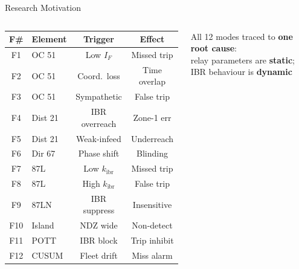\documentclass[aspectratio=169, 10pt]{beamer}
\newcommand{\kibr}{k_{\mathrm{ibr}}}
\begin{document}
\begin{frame}{Research Motivation}
\begin{columns}[T]
      \scriptsize
      \begin{tabular}{@{}clcc@{}}
        \toprule
        \textbf{F\#} & \textbf{Element} & \textbf{Trigger} & \textbf{Effect}\\
        \midrule
        F1  & OC 51   & Low $I_F$       & Missed trip\\
        \rowcolor{lightblue!50}
        F2  & OC 51   & Coord.\ loss    & Time overlap\\
        F3  & OC 51   & Sympathetic     & False trip\\
        \rowcolor{lightblue!50}
        F4  & Dist 21 & IBR overreach   & Zone-1 err\\
        F5  & Dist 21 & Weak-infeed     & Underreach\\
        \rowcolor{lightblue!50}
        F6  & Dir 67  & Phase shift     & Blinding\\
        F7  & 87L     & Low $\kibr$     & Missed trip\\
        \rowcolor{lightblue!50}
        F8  & 87L     & High $\kibr$    & False trip\\
        F9  & 87LN    & IBR suppress    & Insensitive\\
        \rowcolor{lightblue!50}
        F10 & Island  & NDZ wide        & Non-detect\\
        F11 & POTT    & IBR block       & Trip inhibit\\
        \rowcolor{lightblue!50}
        F12 & CUSUM   & Fleet drift     & Miss alarm\\
        \bottomrule
      \end{tabular}
      \vspace{0.2cm}
      \begin{tcolorbox}[alert2]
        \scriptsize\centering
        All 12 modes traced to \textbf{one root cause}:\\
        relay parameters are \textbf{static}; IBR behaviour is \textbf{dynamic}
      \end{tcolorbox}
  \end{columns}


\end{frame}
\end{document}
